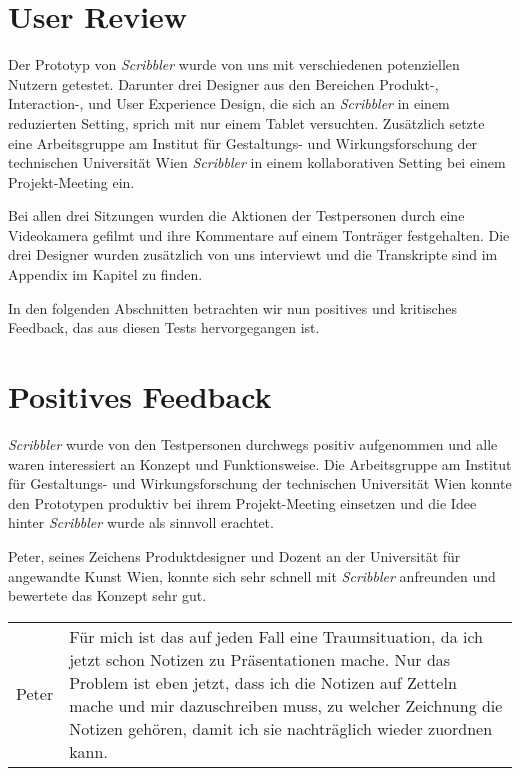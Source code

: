 \section{User Review}
Der Prototyp von \emph{Scribbler} wurde von uns mit verschiedenen potenziellen Nutzern getestet. Darunter drei Designer aus den Bereichen Produkt-, Interaction-, und User Experience Design, die sich an \emph{Scribbler} in einem reduzierten Setting, sprich mit nur einem Tablet versuchten. Zusätzlich setzte eine Arbeitsgruppe am Institut für Gestaltungs- und Wirkungsforschung der technischen Universität Wien \emph{Scribbler} in einem kollaborativen Setting bei einem Projekt-Meeting ein. 

Bei allen drei Sitzungen wurden die Aktionen der Testpersonen durch eine Videokamera gefilmt und ihre Kommentare auf einem Tonträger festgehalten. Die drei Designer wurden zusätzlich von uns interviewt und die Transkripte sind im Appendix im Kapitel  zu finden.

In den folgenden Abschnitten betrachten wir nun positives und kritisches Feedback, das aus diesen Tests hervorgegangen ist.

\section{Positives Feedback}

\emph{Scribbler} wurde von den Testpersonen durchwegs positiv aufgenommen und alle waren interessiert an Konzept und Funktionsweise. Die Arbeitsgruppe am Institut für Gestaltungs- und Wirkungsforschung der technischen Universität Wien konnte den Prototypen produktiv bei ihrem Projekt-Meeting einsetzen und die Idee hinter \emph{Scribbler} wurde als sinnvoll erachtet. 

Peter, seines Zeichens Produktdesigner und Dozent an der Universität für angewandte Kunst Wien, konnte sich sehr schnell mit \emph{Scribbler} anfreunden und bewertete das Konzept sehr gut.

\begin{extract}[Peter, Produktdesigner, über \emph{Scribbler}.]
	{
		\myfloatalign
		\begin{tabularx}{\textwidth}{p{1cm}X}
    		Peter  & Für mich ist das auf jeden Fall eine Traumsituation, da ich jetzt schon Notizen zu Präsentationen mache. Nur das Problem ist eben jetzt, dass ich die Notizen auf Zetteln mache und mir dazuschreiben muss, zu welcher Zeichnung die Notizen gehören, damit ich sie nachträglich wieder zuordnen kann.
		\end{tabularx}
	}
\end{extract}

